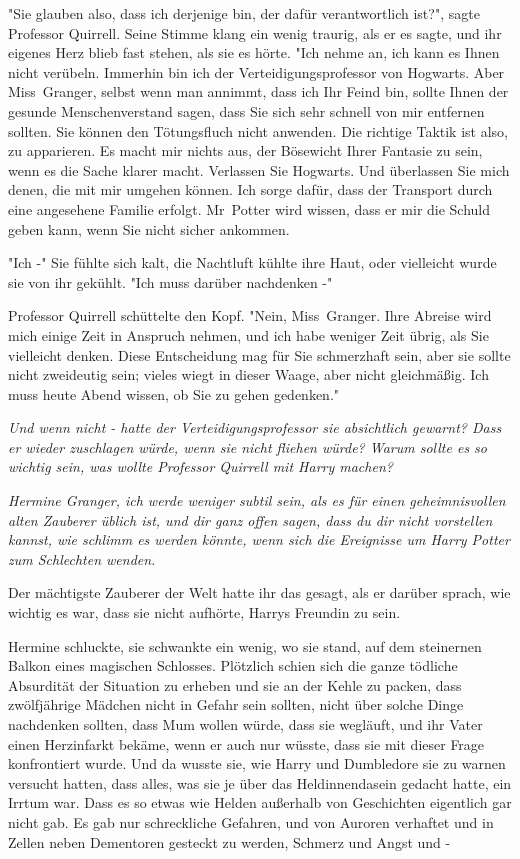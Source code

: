 {"Sie glauben also, dass ich derjenige bin, der dafür verantwortlich ist?", sagte Professor Quirrell. Seine Stimme klang ein wenig traurig, als er es sagte, und ihr eigenes Herz blieb fast stehen, als sie es hörte. "Ich nehme an, ich kann es Ihnen nicht verübeln. Immerhin bin ich der Verteidigungsprofessor von Hogwarts. Aber Miss~Granger, selbst wenn man annimmt, dass ich Ihr Feind bin, sollte Ihnen der gesunde Menschenverstand sagen, dass Sie sich sehr schnell von mir entfernen sollten. Sie können den Tötungsfluch nicht anwenden. Die richtige Taktik ist also, zu apparieren. Es macht mir nichts aus, der Bösewicht Ihrer Fantasie zu sein, wenn es die Sache klarer macht. Verlassen Sie Hogwarts. Und überlassen Sie mich denen, die mit mir umgehen können. Ich sorge dafür, dass der Transport durch eine angesehene Familie erfolgt. Mr~Potter wird wissen, dass er mir die Schuld geben kann, wenn Sie nicht sicher ankommen.

"Ich -" Sie fühlte sich kalt, die Nachtluft kühlte ihre Haut, oder vielleicht wurde sie von ihr gekühlt. "Ich muss darüber nachdenken -"

Professor Quirrell schüttelte den Kopf. "Nein, Miss~Granger. Ihre Abreise wird mich einige Zeit in Anspruch nehmen, und ich habe weniger Zeit übrig, als Sie vielleicht denken. Diese Entscheidung mag für Sie schmerzhaft sein, aber sie sollte nicht zweideutig sein; vieles wiegt in dieser Waage, aber nicht gleichmäßig. Ich muss heute Abend wissen, ob Sie zu gehen gedenken."

\emph{Und wenn nicht - hatte der Verteidigungsprofessor sie absichtlich gewarnt? Dass er wieder zuschlagen würde, wenn sie nicht fliehen würde? Warum sollte es so wichtig sein, was wollte Professor Quirrell mit Harry machen?}

\emph{Hermine Granger, ich werde weniger subtil sein, als es für einen geheimnisvollen alten Zauberer üblich ist, und dir ganz offen sagen, dass du dir nicht vorstellen kannst, wie schlimm es werden könnte, wenn sich die Ereignisse um Harry Potter zum Schlechten wenden.}

Der mächtigste Zauberer der Welt hatte ihr das gesagt, als er darüber sprach, wie wichtig es war, dass sie nicht aufhörte, Harrys Freundin zu sein.

Hermine schluckte, sie schwankte ein wenig, wo sie stand, auf dem steinernen Balkon eines magischen Schlosses. Plötzlich schien sich die ganze tödliche Absurdität der Situation zu erheben und sie an der Kehle zu packen, dass zwölfjährige Mädchen nicht in Gefahr sein sollten, nicht über solche Dinge nachdenken sollten, dass Mum wollen würde, dass sie wegläuft, und ihr Vater einen Herzinfarkt bekäme, wenn er auch nur wüsste, dass sie mit dieser Frage konfrontiert wurde. Und da wusste sie, wie Harry und Dumbledore sie zu warnen versucht hatten, dass alles, was sie je über das Heldinnendasein gedacht hatte, ein Irrtum war. Dass es so etwas wie Helden außerhalb von Geschichten eigentlich gar nicht gab. Es gab nur schreckliche Gefahren, und von Auroren verhaftet und in Zellen neben Dementoren gesteckt zu werden, Schmerz und Angst und -

}
